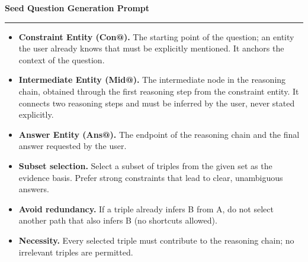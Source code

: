 \begin{table}[t!]
\centering
\caption{\textbf{Prompt for seed question generation.}}
\label{tab: seedquestion}
 
\begin{minipage}{\textwidth}
\begin{mdframed}[style=outerframe]
\begin{center}
  {\small\textbf{Seed Question Generation Prompt}}
\end{center}
\noindent\rule{\linewidth}{0.4pt}


\vspace{4pt}
\begin{mdframed}[style=subframe]


\vspace{4pt}

\vspace{2pt}
\begin{itemize}[leftmargin=*, labelindent=0pt, labelsep=0.6em, itemsep=1pt, topsep=2pt]
  \small
  \item \textbf{Constraint Entity (Con@).} The starting point of the question; an entity the user already knows that must be explicitly mentioned. It anchors the context of the question.
  \item \textbf{Intermediate Entity (Mid@).} The intermediate node in the reasoning chain, obtained through the first reasoning step from the constraint entity. It connects two reasoning steps and must be inferred by the user, never stated explicitly.
  \item \textbf{Answer Entity (Ans@).} The endpoint of the reasoning chain and the final answer requested by the user.
\end{itemize}

\vspace{4pt}
\begin{itemize}[leftmargin=*, labelindent=0pt, labelsep=0.6em, itemsep=1pt, topsep=2pt]
  \small
  \item \textbf{Subset selection.} Select a subset of triples from the given set as the evidence basis. Prefer strong constraints that lead to clear, unambiguous answers.
  \item \textbf{Avoid redundancy.} If a triple already infers B from A, do not select another path that also infers B (no shortcuts allowed).
  \item \textbf{Necessity.} Every selected triple must contribute to the reasoning chain; no irrelevant triples are permitted.
\end{itemize}


\end{mdframed}
\end{mdframed}
\end{minipage}
\end{table}
